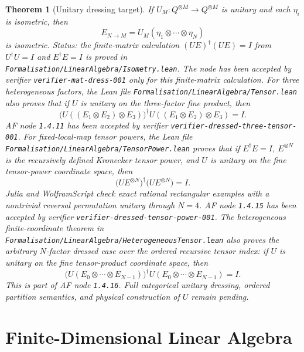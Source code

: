 \documentclass[11pt]{article}
\newtheorem{theorem}[definition]{Theorem}
\begin{document}
\begin{theorem}[Unitary dressing target]
If \(U_M:Q^{\otimes M}\to Q^{\otimes M}\) is unitary and each \(\eta_i\) is
isometric, then
\[
E_{N\to M}=U_M(\eta_1\otimes\cdots\otimes\eta_N)
\]
is isometric. Status: the finite-matrix calculation
\((UE)^\dagger(UE)=I\) from \(U^\dagger U=I\) and \(E^\dagger E=I\) is proved
in \texttt{Formalisation/LinearAlgebra/Isometry.lean}. The node has been
accepted by verifier \texttt{verifier-mat-dress-001} only for this
finite-matrix calculation. For three heterogeneous factors, the Lean file
\texttt{Formalisation/LinearAlgebra/Tensor.lean} also proves that if
\(U\) is unitary on the three-factor fine product, then
\[
\bigl(U((E_1\otimes E_2)\otimes E_3)\bigr)^\dagger
U((E_1\otimes E_2)\otimes E_3)=I.
\]
AF node \texttt{1.4.11} has been accepted by verifier
\texttt{verifier-dressed-three-tensor-001}.
For fixed-local-map tensor powers, the Lean file
\texttt{Formalisation/LinearAlgebra/TensorPower.lean} proves that if
\(E^\dagger E=I\), \(E^{\otimes N}\) is the recursively defined Kronecker
tensor power, and \(U\) is unitary on the fine tensor-power coordinate space,
then
\[
\bigl(U E^{\otimes N}\bigr)^\dagger\bigl(U E^{\otimes N}\bigr)=I.
\]
Julia and WolframScript check exact rational rectangular examples with a
nontrivial reversal permutation unitary through \(N=4\). AF node
\texttt{1.4.15} has been accepted by verifier
\texttt{verifier-dressed-tensor-power-001}.
The heterogeneous finite-coordinate theorem in
\texttt{Formalisation/LinearAlgebra/HeterogeneousTensor.lean} also proves the
arbitrary \(N\)-factor dressed case over the ordered recursive tensor index:
if \(U\) is unitary on the fine tensor-product coordinate space, then
\[
\bigl(U(E_0\otimes\cdots\otimes E_{N-1})\bigr)^\dagger
U(E_0\otimes\cdots\otimes E_{N-1})=I.
\]
This is part of AF node \texttt{1.4.16}. Full categorical unitary dressing,
ordered partition semantics, and physical construction of \(U\) remain
pending.
\end{theorem}

\section{Finite-Dimensional Linear Algebra}
\end{document}

